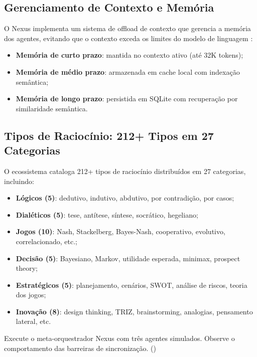 \subsection{Gerenciamento de Contexto e Memória}
\label{subsec:context-memory}

O Nexus implementa um sistema de offload de contexto que gerencia a
memória dos agentes, evitando que o contexto exceda os limites do modelo
de linguagem \cite{achiam2023gpt4, brown2020language}:

\begin{itemize}
\item \textbf{Memória de curto prazo}: mantida no contexto ativo (até
32K tokens);
\item \textbf{Memória de médio prazo}: armazenada em cache local com
indexação semântica;
\item \textbf{Memória de longo prazo}: persistida em SQLite com
recuperação por similaridade semântica.
\end{itemize}

\subsection{Tipos de Raciocínio: 212+ Tipos em 27 Categorias}
\label{subsec:raciocinios}

O ecossistema cataloga 212+ tipos de raciocínio distribuídos em 27
categorias, incluindo:

\begin{itemize}
\item \textbf{Lógicos (5)}: dedutivo, indutivo, abdutivo, por
contradição, por casos;
\item \textbf{Dialéticos (5)}: tese, antítese, síntese, socrático,
hegeliano;
\item \textbf{Jogos (10)}: Nash, Stackelberg, Bayes-Nash, cooperativo,
evolutivo, correlacionado, etc.;
\item \textbf{Decisão (5)}: Bayesiano, Markov, utilidade esperada,
minimax, prospect theory;
\item \textbf{Estratégicos (5)}: planejamento, cenários, SWOT,
análise de riscos, teoria dos jogos;
\item \textbf{Inovação (8)}: design thinking, TRIZ, brainstorming,
analogias, pensamento lateral, etc.
\end{itemize}

\begin{exercicio}
Execute o meta-orquestrador Nexus com três agentes simulados.
Observe o comportamento das barreiras de sincronização.
(\nivelphd)
\end{exercicio}

